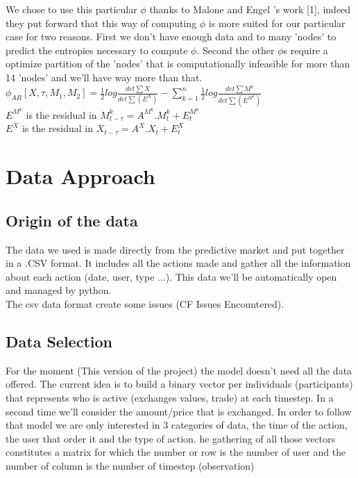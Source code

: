 \documentclass{report}
\begin{document}
We chose to use this particular $\phi $ thanks to Malone and Engel 's work [1], indeed they put forward that this way of computing $\phi $ is more suited for our particular case for two reasons. First we don't have enough data and to many 'nodes' to predict the entropies necessary to compute $\phi $. Second the other $\phi $s require a optimize partition of the 'nodes' that is computationally infeasible for more than 14 'nodes' and we'll have way more than that. \\


$ \phi_{AR} [X, \tau, {M_1 , M_2}] = \frac{1}{2} log\frac{det\sum X}{det\sum (E^X)} - \sum_{k=1}^{n} \frac{1}{2} log \frac{det\sum M^k}{det\sum (E^{M^k})} $ \\

$ E^{M^k}$ is the residual in $ M_{t-\tau}^k = A^{M^k} . M_t^k + E_t^{M^k} $ \\
	
$ E^{X}$ is the residual in $ X_{t-\tau} = A^{X} . X_t + E_t^X $ \\

\chapter{Data Approach}
\section{Origin of the data}

The data we used is made directly from the predictive market and put together in a .CSV format. It includes all the actions made and gather all the information about each action (date, user, type ...). This data we'll be automatically open and managed by python.\\
The csv data format create some issues (CF Issues Encountered).

\section{Data Selection}

For the moment (This version of the project) the model doesn't need all the data offered. The current idea is to build a binary vector per individuals (participants) that represents who is active (exchanges values, trade) at each timestep. In a second time we'll consider the amount/price that is exchanged. In order to follow that model we are only interested in 3 categories of data, the time of the action, the user that order it and the type of action. he gathering of all those vectors constitutes a matrix for which the number or row is the number of user and the number of column is the number of timestep (observation)\\
\end{document}
